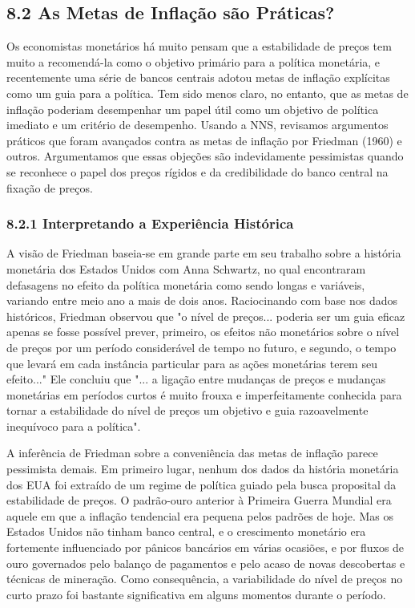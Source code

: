 \documentclass[12pt]{article}
\begin{document}
\subsection{8.2 As Metas de Inflação são Práticas?}

Os economistas monetários há muito pensam que a estabilidade de preços tem muito a recomendá-la como o objetivo primário para a política monetária, e recentemente uma série de bancos centrais adotou metas de inflação explícitas como um guia para a política. Tem sido menos claro, no entanto, que as metas de inflação poderiam desempenhar um papel útil como um objetivo de política imediato e um critério de desempenho. Usando a NNS, revisamos argumentos práticos que foram avançados contra as metas de inflação por Friedman (1960) e outros. Argumentamos que essas objeções são indevidamente pessimistas quando se reconhece o papel dos preços rígidos e da credibilidade do banco central na fixação de preços.

\subsubsection{8.2.1 Interpretando a Experiência Histórica} A visão de Friedman baseia-se em grande parte em seu trabalho sobre a história monetária dos Estados Unidos com Anna Schwartz, no qual encontraram defasagens no efeito da política monetária como sendo longas e variáveis, variando entre meio ano a mais de dois anos. Raciocinando com base nos dados históricos, Friedman observou que "o nível de preços... poderia ser um guia eficaz apenas se fosse possível prever, primeiro, os efeitos não monetários sobre o nível de preços por um período considerável de tempo no futuro, e segundo, o tempo que levará em cada instância particular para as ações monetárias terem seu efeito..." Ele concluiu que "... a ligação entre mudanças de preços e mudanças monetárias em períodos curtos é muito frouxa e imperfeitamente conhecida para tornar a estabilidade do nível de preços um objetivo e guia razoavelmente inequívoco para a política".

A inferência de Friedman sobre a conveniência das metas de inflação parece pessimista demais. Em primeiro lugar, nenhum dos dados da história monetária dos EUA foi extraído de um regime de política guiado pela busca proposital da estabilidade de preços. O padrão-ouro anterior à Primeira Guerra Mundial era aquele em que a inflação tendencial era pequena pelos padrões de hoje. Mas os Estados Unidos não tinham banco central, e o crescimento monetário era fortemente influenciado por pânicos bancários em várias ocasiões, e por fluxos de ouro governados pelo balanço de pagamentos e pelo acaso de novas descobertas e técnicas de mineração. Como consequência, a variabilidade do nível de preços no curto prazo foi bastante significativa em alguns momentos durante o período.
\end{document}
